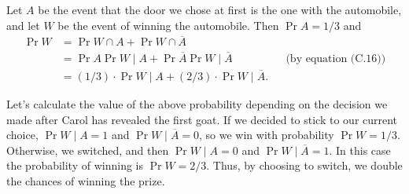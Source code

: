 Let $A$ be the event that the door we chose at first is the one with the automobile, and let $W$ be the event of winning the automobile.
Then $\Pr{A}=1/3$ and
\begin{align*}
    \Pr{W} &= \Pr{W\cap A}+\Pr{W\cap\overline{A}} \\
    &= \Pr{A}\Pr{W\mid A}+\Pr{\overline{A}}\Pr{W\mid\overline{A}} && \text{(by equation (C.16))} \\
    &= (1/3)\cdot\Pr{W\mid A}+(2/3)\cdot\Pr{W\mid\overline{A}}.
\end{align*}

Let's calculate the value of the above probability depending on the decision we made after Carol has revealed the first goat.
If we decided to stick to our current choice, $\Pr{W\mid A}=1$ and $\Pr{W\mid\overline{A}}=0$, so we win with probability $\Pr{W}=1/3$.
Otherwise, we switched, and then $\Pr{W\mid A}=0$ and $\Pr{W\mid\overline{A}}=1$.
In this case the probability of winning is $\Pr{W}=2/3$.
Thus, by choosing to switch, we double the chances of winning the prize.
